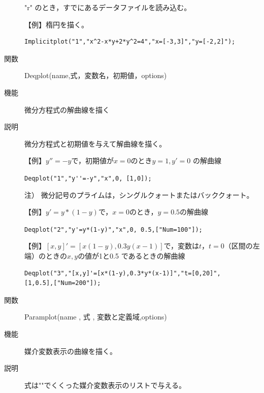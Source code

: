 \documentclass[papersize,a4paper,12pt,uplatex]{jsarticle}
\begin{document}
\begin{description}
"r" のとき，すでにあるデータファイルを読み込む。

\vspace{\baselineskip}
【例】楕円を描く。
\begin{verbatim}
Implicitplot("1","x^2-x*y+2*y^2=4","x=[-3,3]","y=[-2,2]");
\end{verbatim}

\vspace{\baselineskip}
\hspace{20mm}\scalebox{0.9}{}

\vspace{\baselineskip}
\hypertarget{deqplot}{}
\item[関数]Deqplot(name,式，変数名，初期値，options)
\item[機能]微分方程式の解曲線を描く
\item[説明]微分方程式と初期値を与えて解曲線を描く。

\vspace{\baselineskip}
【例】$y''=-y$で，初期値が$x=0$のとき$y=1,y'=0$ の解曲線

\verb|Deqplot("1","y''=-y","x",0, [1,0]); | 
 
注） 微分記号のプライムは，シングルクォートまたはバッククォート。

\vspace{\baselineskip}
\hspace{20mm}

\vspace{\baselineskip}
【例】$y'=y*(1-y)$で，$x=0$のとき，$y=0.5$の解曲線

 \verb|Deqplot("2","y'=y*(1-y)","x",0, 0.5,["Num=100"]);| 
 
\vspace{\baselineskip}
\hspace{20mm}

\vspace{\baselineskip}

【例】$[x,y]'=[x(1-y),0.3y(x-1)]$で，変数は$t$，$t=0$（区間の左端）のときの$x, y$の値が1と0.5 であるときの解曲線
\begin{verbatim}
Deqplot("3","[x,y]'=[x*(1-y),0.3*y*(x-1)]","t=[0,20]",
[1,0.5],["Num=200"]);
\end{verbatim} 

\vspace{\baselineskip}
\hspace{20mm}

\vspace{\baselineskip}
\hypertarget{paramplot}{}
\item[関数]Paramplot(name , 式 , 変数と定義域,options)
\item[機能]媒介変数表示の曲線を描く。
\item[説明]式は""でくくった媒介変数表示のリストで与える。


\end{description}
\end{document}
